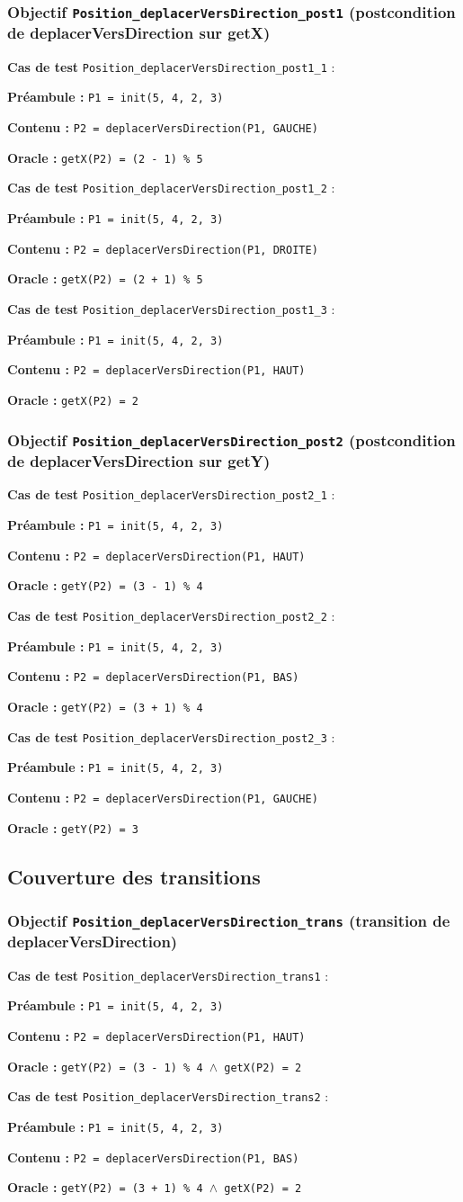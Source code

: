 \documentclass{article}
\newcommand{\cmd}[1]{\texttt{#1}}
\newcommand{\lAND}{$\land$}
\newcommand{\obj}[2]{\subsubsection*{\large{\textbf{Objectif {\cmd{#1} (#2)}}}}}
\newenvironment{cas}[1]
{
	\hspace{1em}\textbf{Cas de test} \cmd{#1} :
	\begin{list}{}{}
}{
	\end{list}\vspace{1em}
}
\newcommand{\pre}[1]{\item \textbf{Préambule :} \cmd{#1}}
\newcommand{\ope}[1]{\item \textbf{Contenu :} \cmd{#1}}
\newcommand{\ora}[1]{\item \textbf{Oracle :} \cmd{#1}}
\begin{document}
\obj{Position\_deplacerVersDirection\_post1} {postcondition de deplacerVersDirection sur getX}
	\begin{cas} {Position\_deplacerVersDirection\_post1\_1}
		\pre{P1 = init(5, 4, 2, 3)}
		\ope{P2 = deplacerVersDirection(P1, GAUCHE)}
		\ora{getX(P2) = (2 - 1) \% 5}
	\end{cas}

	\begin{cas} {Position\_deplacerVersDirection\_post1\_2}
		\pre{P1 = init(5, 4, 2, 3)}
		\ope{P2 = deplacerVersDirection(P1, DROITE)}
		\ora{getX(P2) = (2 + 1) \% 5}
	\end{cas}

	\begin{cas} {Position\_deplacerVersDirection\_post1\_3}
		\pre{P1 = init(5, 4, 2, 3)}
		\ope{P2 = deplacerVersDirection(P1, HAUT)}
		\ora{getX(P2) = 2}
	\end{cas}

\obj{Position\_deplacerVersDirection\_post2} {postcondition de deplacerVersDirection sur getY}
	\begin{cas} {Position\_deplacerVersDirection\_post2\_1}
		\pre{P1 = init(5, 4, 2, 3)}
		\ope{P2 = deplacerVersDirection(P1, HAUT)}
		\ora{getY(P2) = (3 - 1) \% 4}
	\end{cas}

	\begin{cas} {Position\_deplacerVersDirection\_post2\_2}
		\pre{P1 = init(5, 4, 2, 3)}
		\ope{P2 = deplacerVersDirection(P1, BAS)}
		\ora{getY(P2) = (3 + 1) \% 4}
	\end{cas}

	\begin{cas} {Position\_deplacerVersDirection\_post2\_3}
		\pre{P1 = init(5, 4, 2, 3)}
		\ope{P2 = deplacerVersDirection(P1, GAUCHE)}
		\ora{getY(P2) = 3}
	\end{cas}


\subsection{Couverture des transitions}

\obj{Position\_deplacerVersDirection\_trans} {transition de deplacerVersDirection}
	\begin{cas} {Position\_deplacerVersDirection\_trans1}
		\pre{P1 = init(5, 4, 2, 3)}
		\ope{P2 = deplacerVersDirection(P1, HAUT)}
		\ora{getY(P2) = (3 - 1) \% 4 \lAND{} getX(P2) = 2}
	\end{cas}

	\begin{cas} {Position\_deplacerVersDirection\_trans2}
		\pre{P1 = init(5, 4, 2, 3)}
		\ope{P2 = deplacerVersDirection(P1, BAS)}
		\ora{getY(P2) = (3 + 1) \% 4 \lAND{} getX(P2) = 2}
	\end{cas}
\end{document}
